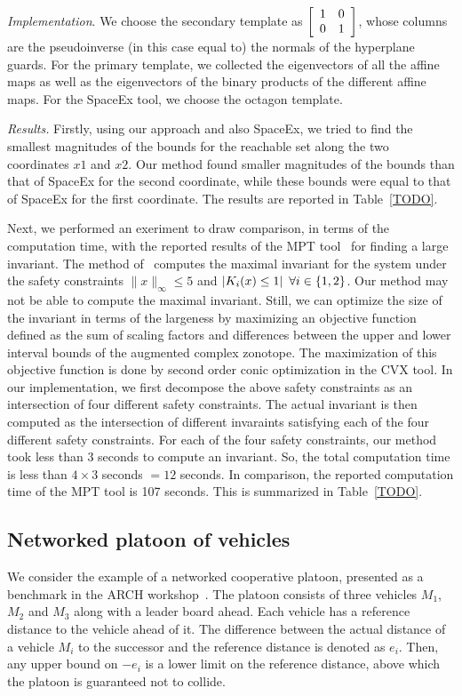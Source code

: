 \emph{Implementation}.  We choose the secondary template as
$\left[\begin{array}{ll}1 & 0\\0 & 1\end{array}\right]$, whose columns are
the pseudoinverse (in this case equal to) the normals of the
hyperplane guards.  For the primary template, we collected the
eigenvectors of all the affine maps as well as the eigenvectors of the
binary products of the different affine maps. For the SpaceEx tool, we
choose the octagon template.

\emph{Results.}  Firstly, using our approach and also SpaceEx, we
tried to find the smallest magnitudes of the bounds for the reachable
set along the two coordinates $x1$ and $x2$.  Our method found smaller
magnitudes of the bounds than that of SpaceEx for the second
coordinate, while these bounds were equal to that of SpaceEx for the
first coordinate.  The results are reported in Table~\ref{TODO}.

Next, we performed an exeriment to draw comparison, in terms of the
computation time, with the reported results of the MPT
tool~\cite{TODO} for finding a large invariant.  The method
of~\cite{TODO} computes the maximal invariant for the system under the
safety constraints $\|x\|_{\infty}\leq 5$ and $\left|K_i(x)\leq
1\right|~\forall i\in\left\{1,2\right\}$.  Our method may not be able to
compute the maximal invariant.  Still, we can optimize the size of the
invariant in terms of the largeness by maximizing an objective function
defined as the sum of scaling factors and differences between the
upper and lower interval bounds of the augmented complex zonotope.
The maximization of this objective function is done by second order
conic optimization in the CVX tool.  In our implementation, we first
decompose the above safety constraints as an intersection of four
different safety constraints.  The actual invariant is then computed
as the intersection of different invaraints satisfying each of the
four different safety constraints.  For each of the four safety
constraints, our method took less than $3$ seconds to compute an
invariant.  So, the total computation time is less than $4\times 3$
seconds $=12$ seconds.  In comparison, the reported computation time
of the MPT tool is 107 seconds.  This is summarized in
Table~\ref{TODO}.

\subsection{Networked platoon of vehicles}
We consider the example of a networked cooperative platoon, presented
as a benchmark in the ARCH workshop~\cite{TODO}.  The platoon consists
of three vehicles $M_1$, $M_2$ and $M_3$ along with a leader board
ahead.  Each vehicle has a reference distance to the vehicle ahead of
it.  The difference between the actual distance of a vehicle $M_i$ to
the successor and the reference distance is denoted as $e_i$.  Then,
any upper bound on $-e_i$ is a lower limit on the reference
distance, above which the platoon is guaranteed not to collide.


